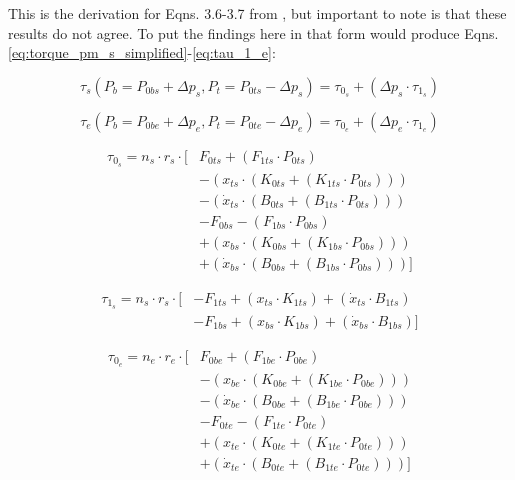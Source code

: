 \documentclass[conference]{IEEEtran}
\begin{document}
	This is the derivation for Eqns. 3.6-3.7 from \cite{main-article}, but important to note is that these results do not agree. To put the findings here in that form would produce Eqns. \eqref{eq:torque_pm_s_simplified}-\eqref{eq:tau_1_e}:
	
	\begin{equation}\label{eq:torque_pm_s_simplified}
		\tau_{s}(P_{b}=P_{0bs}+\Delta p_{s}, P_{t}=P_{0ts}-\Delta p_{s}) = \tau_{0_{s}} + (\Delta p_{s} \cdot \tau_{1_{s}})
	\end{equation}

	\begin{equation}\label{eq:torque_pm_e_simplified}
		\tau_{e}(P_{b}=P_{0be}+\Delta p_{e}, P_{t}=P_{0te}-\Delta p_{e}) = \tau_{0_{e}} + (\Delta p_{e} \cdot \tau_{1_{e}})
	\end{equation}

	\begin{equation}\label{eq:tau_0_s}
		\begin{aligned}
			\tau_{0_{s}} = n_{s} \cdot r_{s} \cdot \lbrack & F_{0ts} + (F_{1ts} \cdot P_{0ts})\\
			&- (x_{ts} \cdot (K_{0ts} + (K_{1ts}\cdot P_{0ts})))\\
			&- (\dot{x}_{ts} \cdot (B_{0ts} + (B_{1ts}\cdot P_{0ts})))\\
			&- F_{0bs} - (F_{1bs} \cdot P_{0bs})\\
			&+ (x_{bs} \cdot (K_{0bs} + (K_{1bs}\cdot P_{0bs})))\\
			&+ (\dot{x}_{bs} \cdot (B_{0bs} + (B_{1bs}\cdot P_{0bs}))) \rbrack
		\end{aligned}
	\end{equation}

	\begin{equation}\label{eq:tau_1_s}
		\begin{aligned}
			\tau_{1_{s}} = n_{s} \cdot r_{s} \cdot \lbrack & - F_{1ts} + (x_{ts} \cdot K_{1ts}) + (\dot{x}_{ts} \cdot B_{1ts})\\
			&- F_{1bs} + (x_{bs} \cdot K_{1bs}) + (\dot{x}_{bs} \cdot B_{1bs}) \rbrack
		\end{aligned}
	\end{equation}

	\begin{equation}\label{eq:tau_0_e}
		\begin{aligned}
			\tau_{0_{e}} = n_{e} \cdot r_{e} \cdot \lbrack & F_{0be} + (F_{1be} \cdot P_{0be})\\
			&- (x_{be} \cdot (K_{0be} + (K_{1be}\cdot P_{0be})))\\
			&- (\dot{x}_{be} \cdot (B_{0be} + (B_{1be}\cdot P_{0be})))\\
			&- F_{0te} - (F_{1te} \cdot P_{0te})\\
			&+ (x_{te} \cdot (K_{0te} + (K_{1te}\cdot P_{0te})))\\
			&+ (\dot{x}_{te} \cdot (B_{0te} + (B_{1te}\cdot P_{0te}))) \rbrack
		\end{aligned}
	\end{equation}
	
\end{document}
